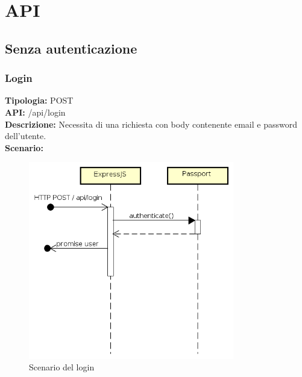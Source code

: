 \section{API}
\subsection{Senza autenticazione}
\subsubsection{Login}
\textbf{Tipologia:} POST \\
\textbf{API:} /api/login \\
\textbf{Descrizione:} Necessita di una richiesta con body contenente email e password dell'utente. \\
\textbf{Scenario:} 
\begin{figure}[h]
\centering
\includegraphics[width=0.8\textwidth]{res/sections/backend/(POST)login.png}
\caption{Scenario del login}
\end{figure}

\newpage
